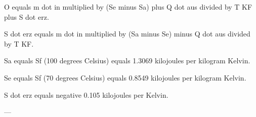 O equals m dot in multiplied by (Se minus Sa) plus Q dot aus divided by T KF plus S dot erz.  

S dot erz equals m dot in multiplied by (Sa minus Se) minus Q dot aus divided by T KF.  

Sa equals Sf (100 degrees Celsius) equals 1.3069 kilojoules per kilogram Kelvin.  

Se equals Sf (70 degrees Celsius) equals 0.8549 kilojoules per kilogram Kelvin.  

S dot erz equals negative 0.105 kilojoules per Kelvin.  

---